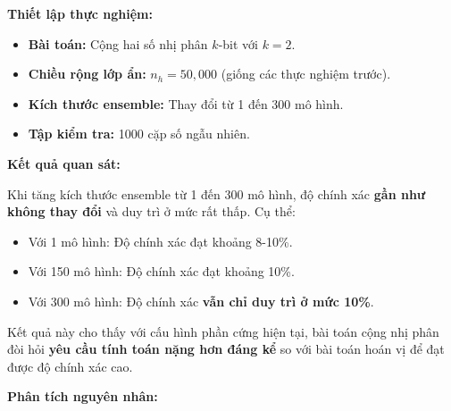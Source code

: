 \vspace{0.2cm}

\textbf{Thiết lập thực nghiệm:}
\begin{itemize}
    \item \textbf{Bài toán:} Cộng hai số nhị phân $k$-bit với $k = 2$.
    \item \textbf{Chiều rộng lớp ẩn:} $n_h = 50,000$ (giống các thực nghiệm trước).
    \item \textbf{Kích thước ensemble:} Thay đổi từ 1 đến 300 mô hình.
    \item \textbf{Tập kiểm tra:} 1000 cặp số ngẫu nhiên.
\end{itemize}

\vspace{0.2cm}

\textbf{Kết quả quan sát:}

Khi tăng kích thước ensemble từ 1 đến 300 mô hình, độ chính xác \textbf{gần như không thay đổi} và duy trì ở mức rất thấp. Cụ thể:
\begin{itemize}
    \item Với 1 mô hình: Độ chính xác đạt khoảng 8-10\%.
    \item Với 150 mô hình: Độ chính xác đạt khoảng 10\%.
    \item Với 300 mô hình: Độ chính xác \textbf{vẫn chỉ duy trì ở mức 10\%}.
\end{itemize}

Kết quả này cho thấy với cấu hình phần cứng hiện tại, bài toán cộng nhị phân đòi hỏi \textbf{yêu cầu tính toán nặng hơn đáng kể} so với bài toán hoán vị để đạt được độ chính xác cao.

\textbf{Phân tích nguyên nhân:}

